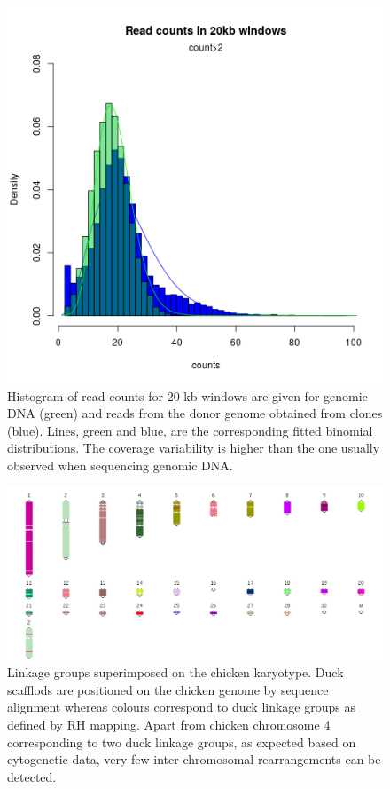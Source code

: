 \documentclass[10pt,letterpaper]{article}
\begin{document}
\begin{figure}[h!]
 \begin{center}
  \includegraphics[scale=0.6]{S2_ReadCounts}
  \end{center}
  \caption{
    Histogram of read counts for 20 kb windows are given for genomic DNA (green) and reads from the donor genome obtained from clones (blue). Lines, green and blue, are the corresponding fitted binomial distributions. The coverage variability is higher than the one usually observed when sequencing genomic DNA. }
\label{suppfig2}
\end{figure}

\begin{figure}[h!]
  \includegraphics[scale=0.4]{S3_DuckScaffoldsKaryotype}
  \caption{
    Linkage groups superimposed on the chicken karyotype. Duck scafflods are positioned on the chicken genome by sequence alignment whereas colours correspond to duck linkage groups as defined by RH mapping. Apart from chicken chromosome 4 corresponding to two duck linkage groups, as expected based on cytogenetic data, very few inter-chromosomal rearrangements can be detected.}
\label{suppfig3}
\end{figure}
\end{document}
